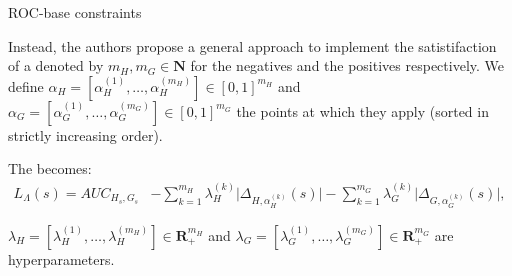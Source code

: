 \begin{frame}{ROC-base constraints}

    Instead, the authors propose a general approach to implement the satistifaction of a  denoted by $m_H,m_G \in \mathbf{N}$ for the negatives and the positives respectively. We define $\alpha_{H} = [\alpha_H^{(1)},\dots,\alpha_H^{(m_H)}]\in[0,1]^{m_H}$ and $\alpha_{G} = [\alpha_G^{(1)},\dots,\alpha_G^{(m_G)}]\in[0,1]^{m_G}$ the points at which they apply (sorted in strictly increasing order).

    The  becomes:
    \begin{align*}
        L_\Lambda(s) = 
        AUC_{H_s,G_s} &- 
        \sum_{k=1}^{m_H} \lambda_H^{(k)}  \big| \Delta_{H,\alpha_H^{
        (k)}}(s) \big| 
        - \sum_{k=1}^{m_G} \lambda_G^{(k)} \big| \Delta_{G,\alpha_G^{(k)}}(s) \big|,
    \end{align*}
     
    $\lambda_H=[\lambda_H^{(1)},\dots,\lambda_H^{(m_H)}]\in \mathbf{R}_+^
    {m_H}$ and $\lambda_G=[\lambda_G^{(1)},\dots,\lambda_G^{(m_G)}]\in \mathbf{R}_+^{m_G}$ are
    hyperparameters.
    
\end{frame}